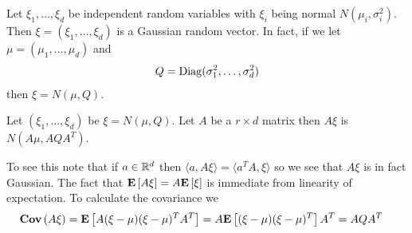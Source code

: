 \begin{examp}Let $\xi_1, \dots, \xi_d$ be independent random variables
  with $\xi_i$ being normal $N(\mu_i, \sigma_i^2)$.  Then $\xi =
  (\xi_1, \dots, \xi_d)$ is a Gaussian random vector.  In fact, if we
  let $\mu = (\mu_1, \dots, \mu_d)$ and 
\begin{align*}
Q = \operatorname*{Diag}(\sigma_1^2, \dots, \sigma_d^2)
\end{align*}
then $\xi = N(\mu, Q)$.
\end{examp}

\begin{examp}\label{LinearTransformationGaussian}Let $(\xi_1, \dots, \xi_d)$ be $\xi = N(\mu, Q)$.  Let
  $A$ be a $r \times d$ matrix then $A \xi$ is $N( A \mu, A Q
  A^T)$.

To see this note that if $a \in \mathbb{R}^d$ then $\langle a , A \xi
\rangle = \langle a^T A, \xi \rangle$ so we see that $A \xi$ is in
fact Gaussian.  The fact that $\textbf{E}\left[A \xi\right] =
A\textbf{E}\left[\xi\right]$ is immediate from linearity of expectation.  To
calculate the covariance we 
\begin{align*}
\textbf{Cov} \left (A\xi \right ) &= \textbf{E}\left[A(\xi - \mu) (\xi - \mu)^T A^T\right] =
A\textbf{E}\left[(\xi - \mu) (\xi - \mu)^T\right]A^T = 
A Q A^T
\end{align*}
\end{examp}


